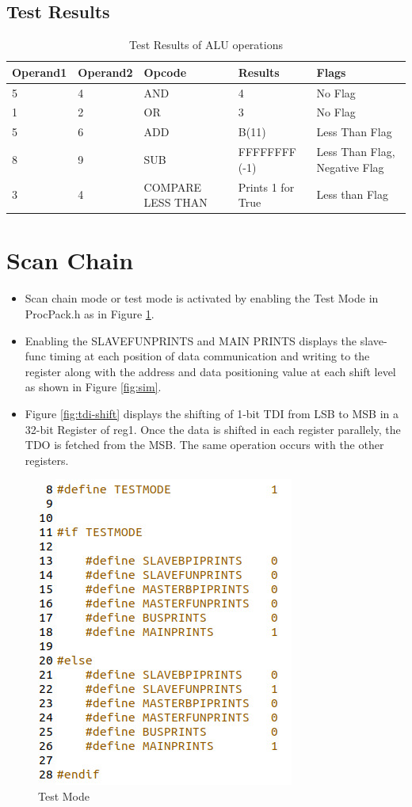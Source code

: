 \documentclass[a4paper,12pt,english]{report}
\begin{document}
\begin{enumerate}
\subsection{Test Results}

\begin{table}[h]
	\centering
	\begin{tabular}{|p{1.65cm}|p{1.65cm}|p{1.8cm}|p{3cm}|p{3cm}|}
		\hline
		Operand1 &  Operand2 &  Opcode &  Results &  Flags \\
		\hline
		5 & 4 & AND & 4 & No Flag \\
        \hline
		1 & 2 & OR & 3 & No Flag \\
        \hline
		5 & 6 & ADD & B(11) & Less Than Flag\\
        \hline
		8 & 9 & SUB & FFFFFFFF (-1) & Less Than Flag, Negative Flag \\
        \hline
		3 & 4 & COMPARE LESS THAN & Prints 1 for True & Less than Flag \\
		\hline
  
	\end{tabular}
 \caption{Test Results of ALU operations}
\end{table}
\newpage

\section{Scan Chain}
\begin{itemize}
    \item Scan chain mode or test mode is activated by enabling the Test Mode in ProcPack.h as in Figure \ref{fig:testmode}.
    \item Enabling the SLAVEFUNPRINTS and MAIN PRINTS displays the slave-func timing at each position of data communication and writing to the register along with the address and data positioning value at each shift level as shown in Figure \ref{fig:sim}.
     \item Figure \ref{fig:tdi-shift} displays the shifting of 1-bit TDI from LSB to MSB in a 32-bit Register of reg1. Once the data is shifted in each register parallely, the TDO is fetched from the MSB. The same operation occurs with the other registers.
\end{itemize}
\begin{figure}[h!]
  \centering
  \includegraphics[width=0.3\linewidth]{testmode.jpg}
  \caption{Test Mode}
  \label{fig:testmode}
\end{figure}



\end{enumerate}
\end{document}
